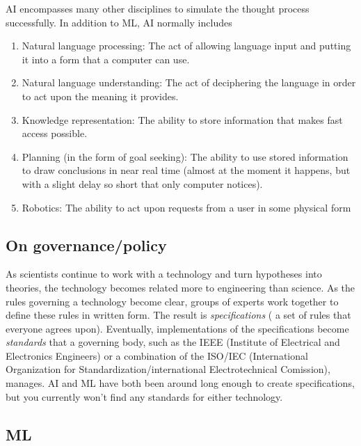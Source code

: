 \begin{enumerate}
	AI encompasses many other disciplines to simulate the thought process successfully. In addition to ML, AI normally includes 
	\begin{enumerate}
		\item Natural language processing: The act of allowing language input and putting it into a form that a computer can use.
		\item Natural language understanding: The act of deciphering the language in order to act upon the meaning it provides.
		\item Knowledge representation: The ability to store information that makes fast access possible.
		\item Planning (in the form of goal seeking): The ability to use stored information to draw conclusions in near real time (almost at the moment it happens, but with a slight delay so short that only computer notices).
		\item Robotics: The ability to act upon requests from a user in some physical form
	\end{enumerate}
	
\end{enumerate}
\subsection{On governance/policy}
As scientists continue to work with a technology and turn hypotheses into theories, the technology becomes related more to engineering than science. As the rules governing a technology become clear, groups of experts work together to define these rules in written form. The result is \emph{specifications} ( a set of rules that everyone agrees upon). Eventually, implementations of the specifications become \emph{standards} that a governing body, such as the IEEE (Institute of Electrical and Electronics Engineers) or a combination of the ISO/IEC (International Organization for Standardization/international Electrotechnical Comission), manages. AI and ML have both been around long enough to create specifications, but you currently won't find any standards for either technology.

\subsection{ML}

